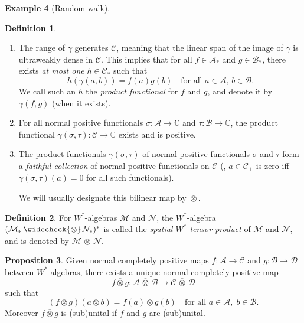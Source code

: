 \documentclass[10pt,a4paper]{amsart}
\theoremstyle{definition}
\newtheorem{definition}{Definition}[section]
\theoremstyle{definition}
\newtheorem{example}[definition]{Example}
\theoremstyle{definition}
\theoremstyle{definition}
\newtheorem{proposition}[definition]{Proposition}
\theoremstyle{definition}
\theoremstyle{definition}
\begin{document}
\begin{example}[Random walk]
\begin{definition}
\begin{enumerate}
    \item The range of \( \gamma \) generates \( \mathcal{C} \), meaning that the linear span of the image of \( \gamma \) is ultraweakly dense in \( \mathcal{C} \). This implies that for all \( f \in \mathcal{A}_* \) and \( g \in \mathcal{B}_* \), there exists \emph{at most one} \( h \in \mathcal{C}_* \) such that
    \[
    h(\gamma(a, b)) = f(a) g(b) \quad \text{for all } a \in \mathcal{A}, \, b \in \mathcal{B}.
    \]
    We call such an \( h \) the \emph{product functional} for \( f \) and \( g \), and denote it by \( \gamma(f, g) \) (when it exists).

    \item For all normal positive functionals \( \sigma: \mathcal{A} \to \mathbb{C} \) and \( \tau: \mathcal{B} \to \mathbb{C} \), the product functional \( \gamma(\sigma, \tau): \mathcal{C} \to \mathbb{C} \) exists and is positive.

    \item The product functionals \( \gamma(\sigma, \tau) \) of normal positive functionals \( \sigma \) and \( \tau \) form a \emph{faithful collection} of normal positive functionals on \( \mathcal{C} \) (\ie, \( a \in \mathcal{C}_+ \) is zero iff \( \gamma(\sigma, \tau)(a) = 0 \) for all such functionals).

We will usually designate this bilinear map by $\overline{\otimes}$.
\end{enumerate}
\end{definition}

\begin{definition}
  For \( W^* \)-algebras \( \mathcal{M} \) and \( \mathcal{N} \), the \( W^* \)-algebra \( (\mathcal{M}_* \, \widecheck{\otimes} \, \mathcal{N}_* )^*\) is called the \emph{spatial \( W^* \)-tensor product} of \( \mathcal{M} \) and \( \mathcal{N} \), and is denoted by \( \mathcal{M} \,\overline{\otimes}\, \mathcal{N} \).
\end{definition}

\begin{proposition} \cite[Proposition 115 II]{westerbaanCategoryNeumannAlgebras2019}
Given normal completely positive  maps \( f : \mathcal{A} \to \mathcal{C} \) and \( g : \mathcal{B} \to \mathcal{D} \) between $W^*$-algebras, there exists a unique normal completely positive map
\[
f \overline{\otimes} g: \mathcal{A} \,\overline{\otimes}\, \mathcal{B} \to \mathcal{C} \,\overline{\otimes}\, \mathcal{D}
\]
such that
\[
(f \otimes g)(a \otimes b) = f(a) \otimes g(b)
\quad \text{for all } a \in \mathcal{A},\; b \in \mathcal{B}.
\]Moreover \( f \overline{\otimes} g \) is (sub)unital if \( f \) and \( g \) are (sub)unital.
\end{proposition}


\end{example}
\end{document}
